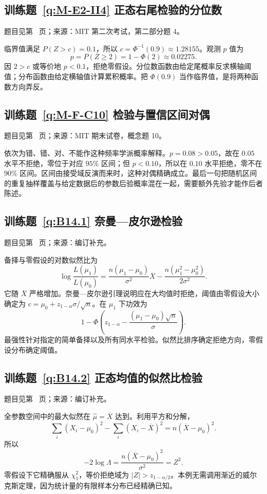 \subsection*{训练题~\ref{q:M-E2-II4} 正态右尾检验的分位数}\label{a:M-E2-II4}{\small 题目见第~\pageref{q:M-E2-II4} 页；来源：MIT 第二次考试，第二部分题 4。}
\begin{solve}临界值满足 $P(Z>c)=0.1$，所以 $c=\Phi^{-1}(0.9)\approx1.28155$。观测 $p$ 值为\[p=P(Z\ge2)=1-\Phi(2)\approx0.02275.\]因 $2>c$ 或等价地 $p<0.1$，拒绝零假设。分位数函数由给定尾概率反求横轴阈值；分布函数由给定横轴值计算累积概率。把 $\Phi(0.9)$ 当作临界值，是将两种函数方向弄反。\end{solve}

\subsection*{训练题~\ref{q:M-F-C10} 检验与置信区间对偶}\label{a:M-F-C10}{\small 题目见第~\pageref{q:M-F-C10} 页；来源：MIT 期末试卷，概念题 10。}
\begin{solve}依次为错、错、对、不能作这种频率学派概率解释。$p=0.08>0.05$，故在 $0.05$ 水平不拒绝，零位于对应 $95\%$ 区间；但 $p<0.10$，所以在 $0.10$ 水平拒绝，零不在 $90\%$ 区间。区间由接受域反演而来时，这种对偶精确成立。最后一句把随机区间的重复抽样覆盖与给定数据后的参数后验概率混在一起，需要额外先验才能作后者陈述。\end{solve}

\subsection*{训练题~\ref{q:B14.1} 奈曼—皮尔逊检验}\label{a:B14.1}{\small 题目见第~\pageref{q:B14.1} 页；来源：编订补充。}
\begin{solve}备择与零假设的对数似然比为\[\log\frac{L(\mu_1)}{L(\mu_0)}=\frac{n(\mu_1-\mu_0)}{\sigma^2}\overline X-\frac{n(\mu_1^2-\mu_0^2)}{2\sigma^2}.\]它随 $\overline X$ 严格增加。奈曼—皮尔逊引理说明应在大均值时拒绝，阈值由零假设大小确定为 $c=\mu_0+z_{1-\alpha}\sigma/\sqrt n$。在 $\mu_1$ 下功效为\[1-\Phi\left(z_{1-\alpha}-\frac{(\mu_1-\mu_0)\sqrt n}{\sigma}\right).\]最强性针对指定的简单备择以及所有同水平检验。似然比排序确定拒绝方向，零假设分布确定阈值。\end{solve}

\subsection*{训练题~\ref{q:B14.2} 正态均值的似然比检验}\label{a:B14.2}{\small 题目见第~\pageref{q:B14.2} 页；来源：编订补充。}
\begin{solve}全参数空间中的最大似然在 $\widehat\mu=\overline X$ 达到。利用平方和分解，\[\sum_i(X_i-\mu_0)^2-\sum_i(X_i-\overline X)^2=n(\overline X-\mu_0)^2.\]所以\[-2\log\Lambda=\frac{n(\overline X-\mu_0)^2}{\sigma^2}=Z^2.\]零假设下它精确服从 $\chi^2_1$，等价拒绝域为 $|Z|>z_{1-\alpha/2}$。本例无需调用渐近的威尔克斯定理，因为统计量的有限样本分布已经精确已知。\end{solve}

